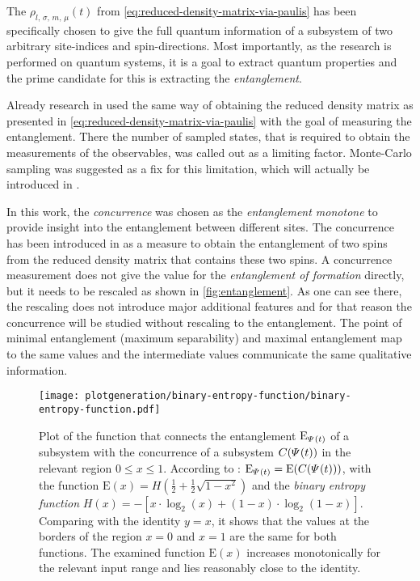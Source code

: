 The $\rho_{l,\,\sigma,\,m,\,\mu} (t)$ from \autoref{eq:reduced-density-matrix-via-paulis} has been specifically chosen to give the full quantum information of a subsystem of two arbitrary site-indices and spin-directions.
Most importantly, as the research is performed on quantum systems, it is a goal to extract quantum properties and the prime candidate for this is extracting the \emph{entanglement}.

Already research in \cite{isingDynamicsWithClassicalNetworks} used the same way of obtaining the reduced density matrix as presented in \autoref{eq:reduced-density-matrix-via-paulis} with the goal of measuring the entanglement.
There the number of sampled states, that is required to obtain the measurements of the observables, was called out as a limiting factor.
Monte-Carlo sampling was suggested as a fix for this limitation, which will actually be introduced in .

In this work, the \emph{concurrence} was chosen as the \emph{entanglement monotone} to provide insight into the entanglement between different sites.
The concurrence has been introduced in \cite{concurrenceMainPaper} as a measure to obtain the entanglement of two spins from the reduced density matrix that contains these two spins.
A concurrence measurement does not give the value for the \emph{entanglement of formation} directly, but it needs to be rescaled as shown in \autoref{fig:entanglement}.
As one can see there, the rescaling does not introduce major additional features and for that reason the concurrence will be studied without rescaling to the entanglement.
The point of minimal entanglement (maximum separability) and maximal entanglement map to the same values and the intermediate values communicate the same qualitative information.

\begin{SCfigure}[2.0][htbp]
    \centering
    \texttt{[image: plotgeneration/binary-entropy-function/binary-entropy-function.pdf]}
    \caption{
        Plot of the function that connects the entanglement $\text{E}_{\varPsi^{}{}(t)}$ of a subsystem with the concurrence of a subsystem $C(\varPsi^{}{}(t))$ in the relevant region $0\leq x \leq 1$.
        According to \cite{concurrenceMainPaper}: $\text{E}_{\varPsi^{}{}(t)} = \text{E}(C(\varPsi^{}{}(t)))$, with the function $\text{E}(x) = H(\frac{1}{2} + \frac{1}{2} \sqrt{1-x^2})$ and the \emph{binary entropy function} $H(x) = -\left[x \cdot \log_2(x) + (1-x) \cdot \log_2(1-x)\right]$.
        Comparing with the identity $y=x$, it shows that the values at the borders of the region $x=0$ and $x=1$ are the same for both functions. 
        The examined function $\text{E}(x)$ increases monotonically for the relevant input range and lies reasonably close to the identity. 
    }
    \label{fig:entanglement}
\end{SCfigure}

